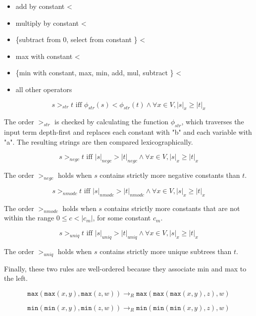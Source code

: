 \begin{itemize}
  \item add by constant <
  \item multiply by constant <
  \item \{subtract from 0, select from constant \} < 
  \item max with constant <
  \item \{min with constant, max, min, add, mul, subtract \} <
  \item all other operators
\end{itemize}

\begin{equation}
s >_{str} t \textrm{ iff } \phi_{str}(s) < \phi_{str}(t) \wedge \forall x \in V, |s|_x \geq |t|_x
\end{equation}

The order $>_{str}$ is checked by calculating the function $\phi_{str}$, which traverses the input term depth-first and replaces each constant with "b" and each variable with "a". The resulting strings are then compared lexicographically.

\begin{equation}
s >_{negc} t \textrm{ iff } |s|_{negc} > |t|_{negc}  \wedge \forall x \in V, |s|_x \geq |t|_x
\end{equation}

The order $>_{negc}$ holds when $s$ contains strictly more negative constants than $t$.

\begin{equation}
s >_{nmodc} t \textrm{ iff } |s|_{nmodc} > |t|_{nmodc}  \wedge \forall x \in V, |s|_x \geq |t|_x
\end{equation}

The order $>_{nmodc}$ holds when $s$ contains strictly more constants that are not within the range $0 \leq c < |c_m|$, for some constant $c_m$. 

\begin{equation}
s >_{uniq} t \textrm{ iff } |s|_{uniq} > |t|_{uniq}  \wedge \forall x \in V, |s|_x \geq |t|_x
\end{equation}

The order $>_{uniq}$ holds when $s$ contains strictly more unique subtrees than $t$.

Finally, these two rules are well-ordered because they associate min and max to the left.

\begin{equation}
\tag{max106}
\texttt{max}(\texttt{max}(x,y), \texttt{max}(z,w)) \rightarrow_R \texttt{max}(\texttt{max}(\texttt{max}(x,y),z),w)
\end{equation}

\begin{equation}
\tag{min106}
\texttt{min}(\texttt{min}(x,y), \texttt{min}(z,w)) \rightarrow_R \texttt{min}(\texttt{min}(\texttt{min}(x,y),z),w)
\end{equation}
